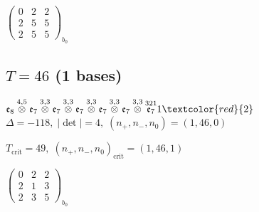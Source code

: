 \documentclass[10pt]{article}
\begin{document}
\hspace{2em}$\left(\begin{smallmatrix}0 & 2 & 2 \\ 2 & 5 & 5 \\ 2 & 5 & 5\end{smallmatrix}\right)_{\!b_0}$


\subsection*{$T = 46$ \quad (1 bases)}
\smallskip

$\mathfrak{e}_8\overset{4,5}{\otimes}\mathfrak{e}_7\overset{3,3}{\otimes}\mathfrak{e}_7\overset{3,3}{\otimes}\mathfrak{e}_7\overset{3,3}{\otimes}\mathfrak{e}_7\overset{3,3}{\otimes}\mathfrak{e}_7\overset{3,3}{\otimes}\overset{321}{\mathfrak{e}_7}1\textcolor{red}{2}$ \quad $\Delta=-118,\; |\det|=4,\; (n_+,n_-,n_0)=(1,46,0)$

\hspace{1em}$T_{\text{crit}}=49,\; (n_+,n_-,n_0)_{\text{crit}}=(1,46,1)$

\hspace{2em}$\left(\begin{smallmatrix}0 & 2 & 2 \\ 2 & 1 & 3 \\ 2 & 3 & 5\end{smallmatrix}\right)_{\!b_0}$
\end{document}
